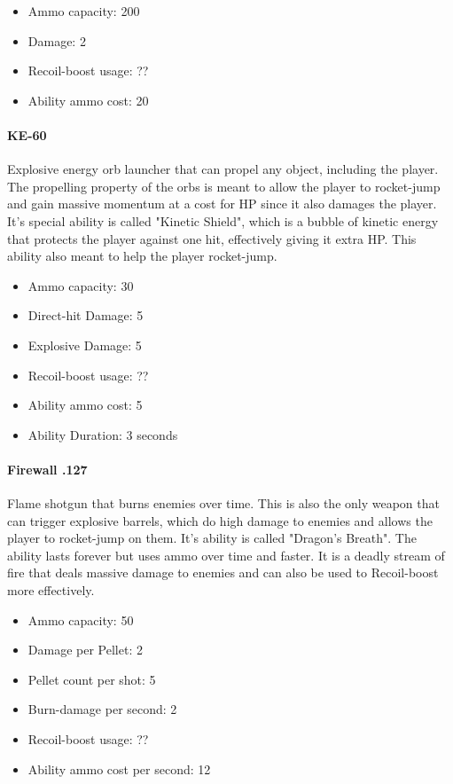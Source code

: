 \documentclass[12pt]{article}
\begin{document}
\begin{itemize}
	\item Ammo capacity: 200
	\item Damage: 2
	\item Recoil-boost usage: ??
	\item Ability ammo cost: 20
\end{itemize}


\paragraph{KE-60}

Explosive energy orb launcher that can propel any object, including the player. The propelling property of the orbs is meant to allow the player to rocket-jump and gain massive momentum at a cost for HP since it also damages the player. It's special ability is called "Kinetic Shield", which is a bubble of kinetic energy that protects the player against one hit, effectively giving it extra HP. This ability also meant to help the player rocket-jump. 

\begin{itemize}
	\item Ammo capacity: 30
	\item Direct-hit Damage: 5
	\item Explosive Damage: 5
	\item Recoil-boost usage: ??
	\item Ability ammo cost: 5
	\item Ability Duration: 3 seconds
\end{itemize} 


\paragraph{Firewall .127}

Flame shotgun that burns enemies over time. This is also the only weapon that can trigger explosive barrels, which do high damage to enemies and allows the player to rocket-jump on them. It's ability is called "Dragon's Breath". The ability lasts forever but uses ammo over time and faster. It is a deadly stream of fire that deals massive damage to enemies and can also be used to Recoil-boost more effectively.

\begin{itemize}
	\item Ammo capacity: 50
	\item Damage per Pellet: 2
	\item Pellet count per shot: 5
	\item Burn-damage per second: 2
	\item Recoil-boost usage: ??
	\item Ability ammo cost per second: 12
\end{itemize} 
\end{document}
